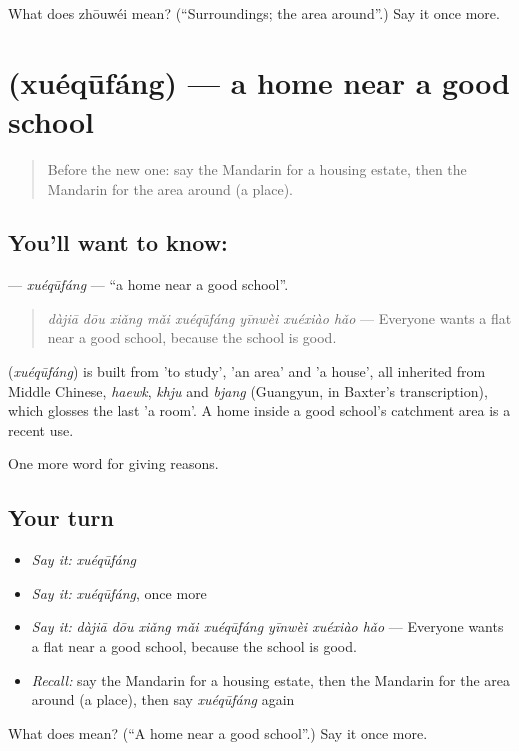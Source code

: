 \begin{tcolorbox}[breakable,colback=teal!4,colframe=teal!35!black,title={Before you move on}]
What does zhōuwéi mean? (\textquotedblleft{}Surroundings; the area around\textquotedblright{}.) Say it once more.
\end{tcolorbox}
\section[\texorpdfstring{\zh{学区房} (xuéqūfáng)}{学区房 (xuéqūfáng)}]{ (xuéqūfáng) — a home near a good school}

\label{lesson:ZH-C377-xuequfang}



\begin{quote}
Before the new one: say the Mandarin for a housing estate, then the Mandarin for the area around (a place).
\end{quote}

\subsection*{You'll want to know: }
\textbf{} — \emph{xuéqūfáng} — \textquotedblleft{}a home near a good school\textquotedblright{}.

\begin{quote}
\textbf{} \emph{dàjiā dōu xiǎng mǎi xuéqūfáng yīnwèi xuéxiào hǎo} — Everyone wants a flat near a good school, because the school is good.
\end{quote}

\begin{cousinweb}
\textbf{} (\emph{xuéqūfáng}) is built from  'to study',  'an area' and  'a house', all inherited from Middle Chinese, \emph{haewk}, \emph{khju} and \emph{bjang} (Guangyun, in Baxter's transcription), which glosses the last 'a room'. A home inside a good school's catchment area is a recent use.
\end{cousinweb}

\begin{grammarlens}[title={What you've built}]
One more word for giving reasons.
\end{grammarlens}

\subsection*{Your turn}
\begin{itemize}
\raggedright
  \item \emph{Say it:} \emph{xuéqūfáng}
  \item \emph{Say it:} \emph{xuéqūfáng}, once more
  \item \emph{Say it:} \emph{dàjiā dōu xiǎng mǎi xuéqūfáng yīnwèi xuéxiào hǎo} — Everyone wants a flat near a good school, because the school is good.
  \item \emph{Recall:} say the Mandarin for a housing estate, then the Mandarin for the area around (a place), then say \emph{xuéqūfáng} again
\end{itemize}

\begin{tcolorbox}[breakable,colback=teal!4,colframe=teal!35!black,title={Before you move on}]
What does  mean? (\textquotedblleft{}A home near a good school\textquotedblright{}.) Say it once more.
\end{tcolorbox}
